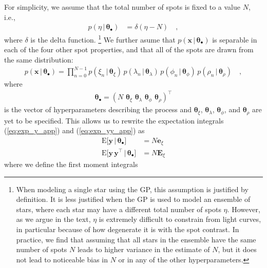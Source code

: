\documentclass[modern]{aastex62}
\begin{document}
For simplicity, we assume that
the total number of spots is fixed to a value $N$, i.e.,
%
\begin{align}
    p(\eta \, \big| \, \pmb{\theta}_\bullet)
     & =
    \delta(\eta - N)
    \quad,
\end{align}
%
where $\delta$ is the delta function.%
\footnote{%
    When modeling a single star using the GP, this assumption is justified by
    definition. It is less justified when the GP is used to model an ensemble of
    stars, where each star may have a different total number of spots $\eta$.
    However, as we argue in the text, $\eta$ is extremely difficult to constrain
    from light curves, in particular because of how degenerate it is with
    the spot contrast. In practice, we find that assuming that all stars in the
    ensemble have the same number of spots $N$ leads to higher variance in the
    estimate of $N$, but it does not lead to noticeable bias in $N$ or in any of
    the other hyperparameters.
}
We further asume that
$p(\mathbf{x} \, \big| \, \pmb{\theta}_\bullet)$
is separable in each of the four other spot properties, and that all of the spots
are drawn from the same distribution:
%
\begin{align}
    p(\mathbf{x} \, \big| \, \pmb{\theta}_\bullet)
    =
    \prod_{n=0}^{N-1}
    p(\xi_n \, \big| \, \pmb{\theta}_{\xi}) \,
    p(\lambda_n \, \big| \, \pmb{\theta}_{\lambda}) \,
    p(\phi_n \, \big| \, \pmb{\theta}_{\phi})\,
    p(\rho_n \, \big| \, \pmb{\theta}_{\rho})
    \quad,
\end{align}
%
where
%
\begin{align}
    \pmb{\theta}_\bullet = \left(
    N \, \,
    \pmb{\theta}_{\xi} \, \,
    \pmb{\theta}_{\lambda} \, \,
    \pmb{\theta}_{\phi} \, \,
    \pmb{\theta}_{\rho} \right)^\top
\end{align}
%
is the vector of hyperparameters describing the process and
$\pmb{\theta}_{\xi}$,
$\pmb{\theta}_{\lambda}$,
$\pmb{\theta}_{\phi}$, and
$\pmb{\theta}_{\rho}$ are yet to be specified.
%
This allows us to rewrite the expectation integrals (\ref{eq:exp_y_app})
and (\ref{eq:exp_yy_app}) as
%
\begin{align}
    \label{eq:exp_y_sep}
    \mathrm{E} \Big[ \mathbf{y} \, \Big| \, \pmb{\theta}_\bullet \Big]
     & =
    N \mathbf{e}_\xi
    \\[1em]
    \label{eq:exp_yy_sep}
    \mathrm{E} \Big[ \mathbf{y} \, \mathbf{y}^\top \, \Big| \, \pmb{\theta}_\bullet \Big]
     & =
    N \mathbf{E}_\xi
\end{align}
%
where we define the first moment integrals
\end{document}
